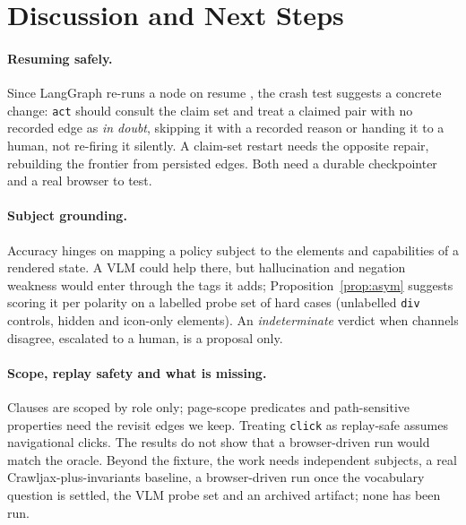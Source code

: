\section{Discussion and Next Steps}
\label{sec:discussion}

\paragraph{Resuming safely.}
Since LangGraph re-runs a node on resume \cite{langgraph2026durable}, the crash test suggests a concrete change: \texttt{act} should
consult the claim set and treat a claimed pair with no recorded edge as \emph{in
doubt}, skipping it with a recorded reason or handing it to a human, not re-firing
it silently. A claim-set restart needs the opposite repair, rebuilding the frontier
from persisted edges. Both need a durable checkpointer and a real browser to test.

\paragraph{Subject grounding.}
Accuracy hinges on mapping a policy subject to the elements and capabilities of a
rendered state. A VLM could help there, but hallucination and negation weakness
would enter through the tags it adds; Proposition~\ref{prop:asym} suggests scoring
it per polarity on a labelled probe set of hard cases (unlabelled \texttt{div}
controls, hidden and icon-only elements). An \emph{indeterminate} verdict when
channels disagree, escalated to a human, is a proposal only.

\paragraph{Scope, replay safety and what is missing.}
Clauses are scoped by role only; page-scope predicates and path-sensitive
properties need the revisit edges we keep. Treating \texttt{click} as replay-safe
assumes navigational clicks. The results do not show that a browser-driven run
would match the oracle. Beyond the
fixture, the work needs independent subjects, a real Crawljax-plus-invariants
baseline, a browser-driven run once the vocabulary question is settled, the VLM
probe set and an archived artifact; none has been run.
